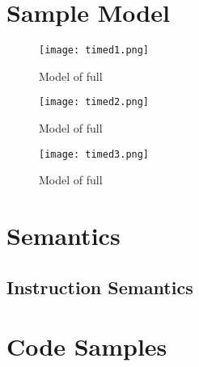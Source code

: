 \chapter{Sample Model}
\begin{figure}
  \texttt{[image: timed1.png]}
  \caption{Model of full \jcl}
\end{figure}
\begin{figure}
  \texttt{[image: timed2.png]}
  \caption{Model of full \jcl}
\end{figure}
\begin{figure}
  \texttt{[image: timed3.png]}
  \caption{Model of full \jcl}
\end{figure}

\chapter{Semantics}\label{chap:semantics}

\section{Instruction Semantics}



\chapter{Code Samples}
